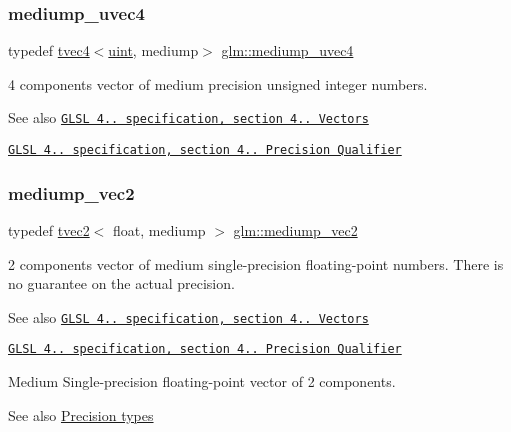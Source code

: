 \subsubsection{\texorpdfstring{mediump\+\_\+uvec4}{mediump\_uvec4}}
{\footnotesize\ttfamily typedef \hyperlink{structglm_1_1tvec4}{tvec4}$<$\hyperlink{group__core__precision_ga4fd29415871152bfb5abd588334147c8}{uint}, mediump$>$ \hyperlink{group__core__precision_ga825e1e6ef3513c5de283d1b2fa1d4879}{glm\+::mediump\+\_\+uvec4}}

4 components vector of medium precision unsigned integer numbers.

\begin{DoxySeeAlso}{See also}
\href{http://www.opengl.org/registry/doc/GLSLangSpec.4.20.8.pdf}{\tt G\+L\+SL 4.. specification, section 4.. Vectors} 

\href{http://www.opengl.org/registry/doc/GLSLangSpec.4.20.8.pdf}{\tt G\+L\+SL 4.. specification, section 4.. Precision Qualifier} 
\end{DoxySeeAlso}
\mbox{\label{group__core__precision_ga949639029259b8bf5c4bc96bd2cc5a59}} 
\subsubsection{\texorpdfstring{mediump\+\_\+vec2}{mediump\_vec2}}
{\footnotesize\ttfamily typedef \hyperlink{structglm_1_1tvec2}{tvec2}$<$ float, mediump $>$ \hyperlink{group__core__precision_ga949639029259b8bf5c4bc96bd2cc5a59}{glm\+::mediump\+\_\+vec2}}

2 components vector of medium single-\/precision floating-\/point numbers. There is no guarantee on the actual precision.

\begin{DoxySeeAlso}{See also}
\href{http://www.opengl.org/registry/doc/GLSLangSpec.4.20.8.pdf}{\tt G\+L\+SL 4.. specification, section 4.. Vectors} 

\href{http://www.opengl.org/registry/doc/GLSLangSpec.4.20.8.pdf}{\tt G\+L\+SL 4.. specification, section 4.. Precision Qualifier}
\end{DoxySeeAlso}
Medium Single-\/precision floating-\/point vector of 2 components. \begin{DoxySeeAlso}{See also}
\hyperlink{group__core__precision}{Precision types} 
\end{DoxySeeAlso}
\mbox{\label{group__core__precision_gac76bf24aca62ca13269d262121d04ceb}} 
